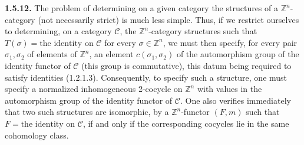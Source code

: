 \noindent\textbf{1.5.12.}\quad
The problem of determining on a given category the structures of a
$\mathbb Z^n$-category (not necessarily strict) is much less simple.
Thus, if we restrict ourselves to determining, on a category
$\mathcal C$, the $\mathbb Z^n$-category structures such that
$T(\sigma)=\text{the identity on }\mathcal C$ for every
$\sigma\in\mathbb Z^n$, we must then specify, for every pair
$\sigma_1,\sigma_2$ of elements of $\mathbb Z^n$, an element
$c(\sigma_1,\sigma_2)$ of the automorphism group of the identity
functor of $\mathcal C$ (this group is commutative), this datum being
required to satisfy identities (1.2.1.3). Consequently, to specify such
a structure, one must specify a normalized inhomogeneous 2-cocycle on
$\mathbb Z^n$ with values in the automorphism group of the identity
functor of $\mathcal C$. One also verifies immediately that two such
structures are isomorphic, by a $\mathbb Z^n$-functor $(F,m)$ such that
$F=\text{the identity on }\mathcal C$, if and only if the corresponding
cocycles lie in the same cohomology class.
